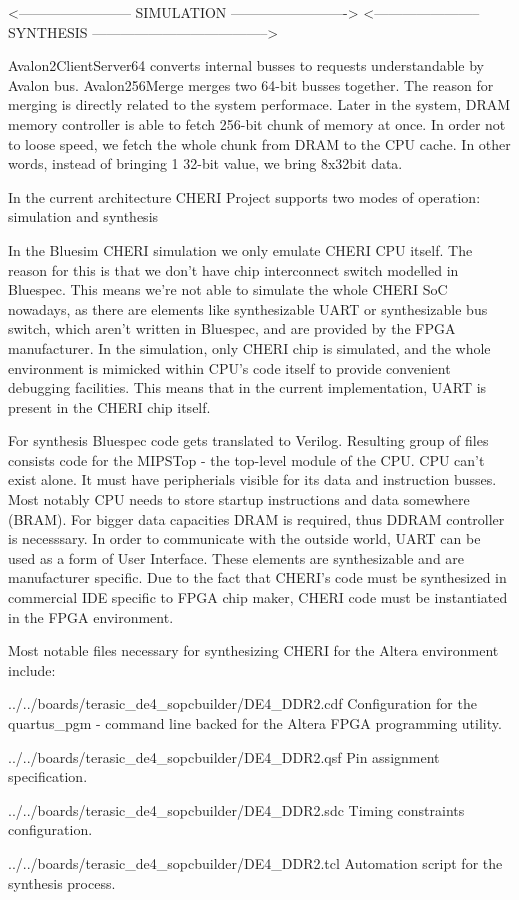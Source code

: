 <------------------------ SIMULATION ------------------------->
 <-----------------------  SYNTHESIS  -------------------------------------->

Avalon2ClientServer64 converts internal busses to requests understandable by Avalon bus.
Avalon256Merge merges two 64-bit busses together.
The reason for merging is directly related to the system performace.
Later in the system, DRAM memory controller is able to fetch 256-bit chunk of memory at once.
In order not to loose speed, we fetch the whole chunk from DRAM to the CPU cache.
In other words, instead of bringing 1 32-bit value, we bring 8x32bit data.

In the current architecture CHERI Project supports two modes of operation:
simulation and synthesis

In the Bluesim CHERI simulation we only emulate CHERI CPU itself.
The reason for this is that we don't have chip interconnect switch modelled in Bluespec.
This means we're not able to simulate the whole CHERI SoC nowadays, as there
are elements like synthesizable UART or synthesizable bus switch, which aren't
written in Bluespec, and are provided by the FPGA manufacturer.
In the simulation, only CHERI chip is simulated, and the whole environment is mimicked within
CPU's code itself to provide convenient debugging facilities.
This means that in the current implementation, UART is present in the CHERI chip itself.

For synthesis Bluespec code gets translated to Verilog.
Resulting group of files consists code for the MIPSTop - the top-level module of the CPU.
CPU can't exist alone.
It must have peripherials visible for its data and instruction busses.
Most notably CPU needs to store startup instructions and data somewhere (BRAM).
For bigger data capacities DRAM is required, thus DDRAM controller is necesssary.
In order to communicate with the outside world, UART can be used as a form of User Interface.
These elements are synthesizable and are manufacturer specific.
Due to the fact that CHERI's code must be synthesized in commercial IDE specific to FPGA chip
maker, CHERI code must be instantiated in the FPGA environment.

Most notable files necessary for synthesizing CHERI for the Altera environment include:

../../boards/terasic_de4_sopcbuilder/DE4_DDR2.cdf
	Configuration for the quartus_pgm - command line backed for the Altera FPGA programming utility.

../../boards/terasic_de4_sopcbuilder/DE4_DDR2.qsf
	Pin assignment specification.

../../boards/terasic_de4_sopcbuilder/DE4_DDR2.sdc
	Timing constraints configuration.

../../boards/terasic_de4_sopcbuilder/DE4_DDR2.tcl
	Automation script for the synthesis process.
